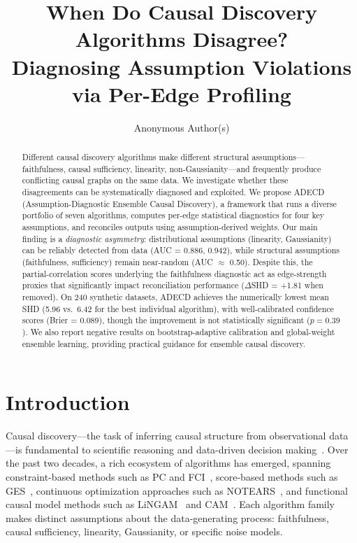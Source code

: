 \documentclass{article}
\title{When Do Causal Discovery Algorithms Disagree? \\ Diagnosing Assumption Violations via Per-Edge Profiling}
\author{
  Anonymous Author(s)
}
\newcommand{\adecd}{\textsc{ADECD}}
\begin{document}
\maketitle

\begin{abstract}
Different causal discovery algorithms make different structural assumptions---faithfulness, causal sufficiency, linearity, non-Gaussianity---and frequently produce conflicting causal graphs on the same data.
We investigate whether these disagreements can be systematically diagnosed and exploited.
We propose \adecd{} (Assumption-Diagnostic Ensemble Causal Discovery), a framework that runs a diverse portfolio of seven algorithms, computes per-edge statistical diagnostics for four key assumptions, and reconciles outputs using assumption-derived weights.
Our main finding is a \emph{diagnostic asymmetry}: distributional assumptions (linearity, Gaussianity) can be reliably detected from data (AUC = 0.886, 0.942), while structural assumptions (faithfulness, sufficiency) remain near-random (AUC $\approx$ 0.50).
Despite this, the partial-correlation scores underlying the faithfulness diagnostic act as edge-strength proxies that significantly impact reconciliation performance ($\Delta$SHD = +1.81 when removed).
On 240 synthetic datasets, \adecd{} achieves the numerically lowest mean SHD (5.96 vs.\ 6.42 for the best individual algorithm), with well-calibrated confidence scores (Brier = 0.089), though the improvement is not statistically significant ($p = 0.39$).
We also report negative results on bootstrap-adaptive calibration and global-weight ensemble learning, providing practical guidance for ensemble causal discovery.
\end{abstract}

\section{Introduction}

Causal discovery---the task of inferring causal structure from observational data---is fundamental to scientific reasoning and data-driven decision making~\citep{spirtes2000causation, kaddour2022causal}.
Over the past two decades, a rich ecosystem of algorithms has emerged, spanning constraint-based methods such as PC and FCI~\citep{spirtes2000causation}, score-based methods such as GES~\citep{chickering2002optimal}, continuous optimization approaches such as NOTEARS~\citep{zheng2018dags}, and functional causal model methods such as LiNGAM~\citep{shimizu2006linear} and CAM~\citep{buhlmann2014cam}.
Each algorithm family makes distinct assumptions about the data-generating process: faithfulness, causal sufficiency, linearity, Gaussianity, or specific noise models.
\end{document}
